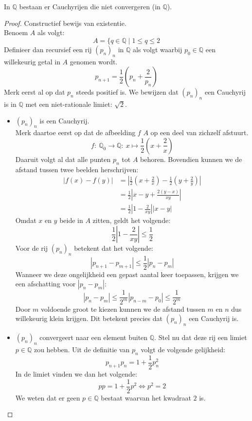 \documentclass[main.tex]{subfiles}
\begin{document}
\begin{pr}
  In $\mathbb{Q}$ bestaan er Cauchyrijen die niet convergeren (in $\mathbb{Q}$).

  \begin{proof}
    Constructief bewijs van existentie.\\
    Benoem $A$ als volgt:
    \[ A = \{ q \in \mathbb{Q} \mid 1 \le q \le 2 \]
    Definieer dan recursief een rij $(p_{n})_{n}$ in $\mathbb{Q}$ als volgt waarbij $p_{0}\in\mathbb{Q}$ een willekeurig getal in $A$ genomen wordt.
    \[ p_{n+1} = \frac{1}{2}\left( p_{n} + \frac{2}{p_{n}} \right) \]
    Merk eerst al op dat $p_{n}$ steeds positief is.
    We bewijzen dat $(p_{n})_{n}$ een Cauchyrij is in $\mathbb{Q}$ met een niet-rationale limiet: $\sqrt{2}$.
    \begin{itemize}
    \item $(p_{n})_{n}$ is een Cauchyrij.\\
      Merk daartoe eerst op dat de afbeelding $f$ $A$ op een deel van zichzelf afstuurt.
      \[ f:\ \mathbb{Q}_{0} \rightarrow \mathbb{Q}:\ x \mapsto \frac{1}{2}\left(x+\frac{2}{x}\right) \]
      Daaruit volgt al dat alle punten $p_{n}$ tot $A$ behoren.
      Bovendien kunnen we de afstand tussen twee beelden herschrijven:
      \[
      \begin{array}{rl}
        |f(x) - f(y)| &=
        \left| \frac{1}{2}\left(x+\frac{2}{x}\right) - \frac{1}{2}\left(y+\frac{2}{y}\right) \right|\\
        &= \frac{1}{2} \left| x-y + \frac{2(y-x)}{xy} \right|\\
        &= \frac{1}{2} \left| 1 - \frac{2}{xy}\right| |x-y|
      \end{array}
      \]
      Omdat $x$ en $y$ beide in $A$ zitten, geldt het volgende:
      \[ \frac{1}{2} \left| 1 - \frac{2}{xy}\right| \le \frac{1}{2} \]
      Voor de rij $(p_{n})_{n}$ betekent dat het volgende:
      \[ |p_{n+1} - p_{m+1}| \le \frac{1}{2}|p_{n}-p_{m}| \]
      Wanneer we deze ongelijkheid een gepast aantal keer  toepassen, krijgen we een afschatting voor $|p_{n}-p_{m}|$:
      \[ |p_{n}-p_{m}| \le \frac{1}{2^{m}}|p_{n-m}-p_{0}| \le \frac{1}{2^{m}} \]
      Door $m$ voldoende groot te kiezen kunnen we de afstand tussen $m$ en $n$ dus willekeurig klein krijgen.
      Dit betekent precies dat $(p_{n})_{n}$ een Cauchyrij is.
    \item $(p_{n})_{n}$ convergeert naar een element buiten $\mathbb{Q}$.
      Stel nu dat deze rij een limiet $p \in \mathbb{Q}$ zou hebben.
      Uit de definitie van $p_{n}$ volgt de volgende gelijkheid:
      \[ p_{n+1}p_{n} = 1 + \frac{1}{2}p_{n}^{2} \]
      In de limiet vinden we dan het volgende:
      \[ pp = 1 + \frac{1}{2}p^{2} \Leftrightarrow p^{2} = 2 \]
      We weten dat er geen $p\in\mathbb{Q}$ bestaat waarvan het kwadraat $2$ is.\needed
    \end{itemize}
  \end{proof}
\end{pr}
\end{document}

